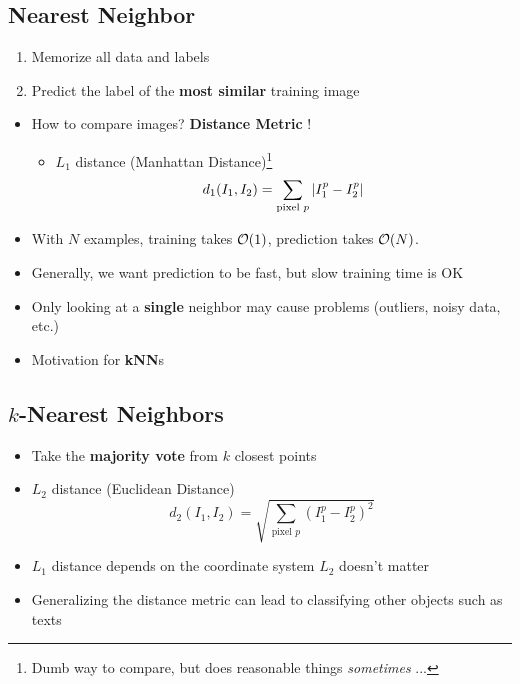 \subsection{Nearest Neighbor}
\begin{enumerate}
	\item Memorize all data and labels
	\item Predict the label of the \textbf{most similar} training image
\end{enumerate}
\begin{itemize}
	\item How to compare images? \textbf{Distance Metric} !
	\begin{itemize}
		\item $L_1$ distance (Manhattan Distance)\footnote{Dumb way to compare, but does reasonable things \textit{sometimes} ...}
		$$d_1(I_1, I_2) = \sum_{\textrm{pixel } p} \left|I_1^p - I_2^p\right|$$
	\end{itemize}
	\item With $N$ examples, training takes $\mathcal{O}(1)$, prediction takes $\mathcal{O}(N)$.
	\item Generally, we want prediction to be fast, but slow training time is OK
	\item Only looking at a \textbf{single} neighbor may cause problems (outliers, noisy data, etc.)
	\item Motivation for \textbf{kNN}s
\end{itemize}

\subsection{$k$-Nearest Neighbors}
\begin{itemize}
	\item Take the \textbf{majority vote} from $k$ closest points
	\item $L_2$ distance (Euclidean Distance)
	$$d_2(I_1, I_2) = \sqrt{\sum_{\textrm{pixel } p} \left(I_1^p - I_2^p\right)^2}$$
	\item $L_1$ distance depends on the coordinate system $L_2$ doesn't matter
	\item Generalizing the distance metric can lead to classifying other objects such as texts
\end{itemize}

